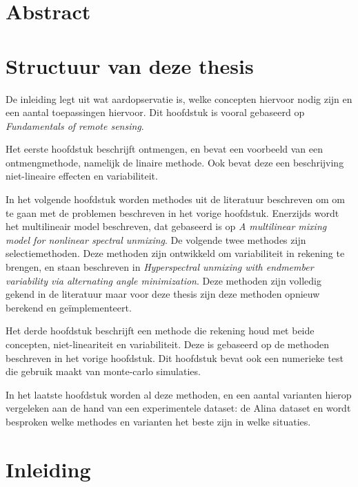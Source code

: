 \documentclass[12pt]{report}
\begin{document}
\newpage
\chapter*{Abstract}



\newpage
\chapter*{Structuur van deze thesis}

De inleiding legt uit wat aardopservatie is, welke concepten hiervoor nodig zijn en een aantal toepassingen hiervoor. Dit hoofdstuk is vooral gebaseerd op \textit{Fundamentals of remote sensing\cite{fun}}.

Het eerste hoofdstuk beschrijft ontmengen, en bevat een voorbeeld van een ontmengmethode, namelijk de linaire methode. Ook bevat deze een beschrijving niet-lineaire effecten en variabiliteit. 

In het volgende hoofdstuk worden methodes uit de literatuur beschreven om om te gaan met de problemen beschreven in het vorige hoofdstuk. Enerzijds wordt het multilineair model beschreven, dat gebaseerd is op \textit{A multilinear mixing model for nonlinear spectral unmixing}\cite{mlinmix}. De volgende twee methodes zijn selectiemethoden. Deze methoden zijn ontwikkeld om variabiliteit in rekening te brengen, en staan beschreven in \textit{Hyperspectral unmixing with endmember variability via alternating angle minimization}\cite{mesma}. Deze methoden zijn volledig gekend in de literatuur maar voor deze thesis zijn deze methoden opnieuw berekend en ge\"implementeert. 

Het derde hoofdstuk beschrijft een methode die rekening houd met beide concepten, niet-lineariteit en variabiliteit. Deze is gebaseerd op de methoden beschreven in het vorige hoofdstuk. Dit hoofdstuk bevat ook een numerieke test die gebruik maakt van monte-carlo simulaties.

In het laatste hoofdstuk worden al deze methoden, en een aantal varianten hierop vergeleken aan de hand van een experimentele dataset: de Alina dataset\cite{Alina} en wordt besproken welke methodes en varianten het beste zijn in welke situaties. 
\newpage
\chapter*{Inleiding}
\end{document}
